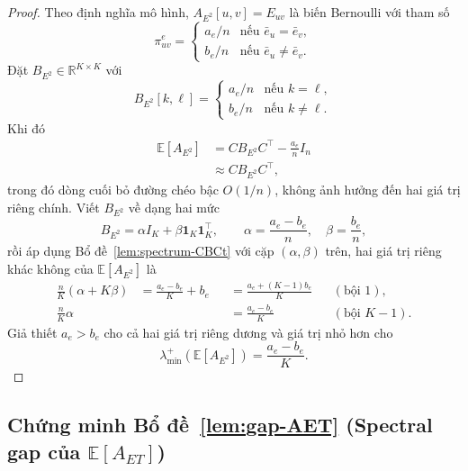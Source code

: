 \begin{proof}
Theo định nghĩa mô hình, $A_{E^2}[u, v] = E_{uv}$ là biến Bernoulli với tham số
\[
    \pi^e_{uv} = \begin{cases}
        a_e/n & \text{nếu } \bar e_u = \bar e_v, \\[2pt]
        b_e/n & \text{nếu } \bar e_u \neq \bar e_v.
    \end{cases}
\]
Đặt $B_{E^2} \in \mathbb{R}^{K \times K}$ với
\[
    B_{E^2}[k, \ell] = \begin{cases}
        a_e/n & \text{nếu } k = \ell, \\[2pt]
        b_e/n & \text{nếu } k \neq \ell.
    \end{cases}
\]
Khi đó
\begin{align*}
    \mathbb{E}[A_{E^2}]
        &= C B_{E^2} C^\top - \frac{a_e}{n} I_n \\
        &\approx C B_{E^2} C^\top,
\end{align*}
trong đó dòng cuối bỏ đường chéo bậc $O(1/n)$, không ảnh hưởng đến hai giá trị riêng chính. Viết $B_{E^2}$ về dạng hai mức
\[
    B_{E^2} = \alpha I_K + \beta \mathbf{1}_K \mathbf{1}_K^\top, \qquad \alpha = \dfrac{a_e - b_e}{n}, \quad \beta = \dfrac{b_e}{n},
\]
rồi áp dụng Bổ đề~\ref{lem:spectrum-CBCt} với cặp $(\alpha, \beta)$ trên, hai giá trị riêng khác không của $\mathbb{E}[A_{E^2}]$ là
\begin{align*}
    \frac{n}{K} (\alpha + K \beta) &= \frac{a_e - b_e}{K} + b_e &&= \frac{a_e + (K-1) b_e}{K} && (\text{bội } 1), \\
    \frac{n}{K} \alpha             &                            &&= \frac{a_e - b_e}{K}        && (\text{bội } K-1).
\end{align*}
Giả thiết $a_e > b_e$ cho cả hai giá trị riêng dương và giá trị nhỏ hơn cho
\[
    \lambda_{\min}^+(\mathbb{E}[A_{E^2}]) = \dfrac{a_e - b_e}{K}.
\]
\end{proof}

\subsection*{Chứng minh Bổ đề~\ref{lem:gap-AET} (Spectral gap của $\mathbb{E}[A_{ET}]$)}

